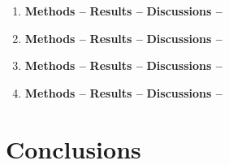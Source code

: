 \documentclass[a4paper]{article}
\begin{document}
			
			\begin{enumerate} [label*=\textbf{(\alph*)}]
	
	
				\item
					\subitem \textbf{Methods  --}
					\subitem \textbf{Results  --}
					\subitem \textbf{Discussions  --}
	
	
				\item
					\subitem \textbf{Methods  --}
					\subitem \textbf{Results  --}
					\subitem \textbf{Discussions  --}
	
	
				\item
					\subitem \textbf{Methods  --}
					\subitem \textbf{Results  --}
					\subitem \textbf{Discussions  --}
	
	
				\item
					\subitem \textbf{Methods  --}
					\subitem \textbf{Results  --}
					\subitem \textbf{Discussions  --}
	
			\end{enumerate}



		\section{Conclusions} \label{3:conclusions}
\end{document}
